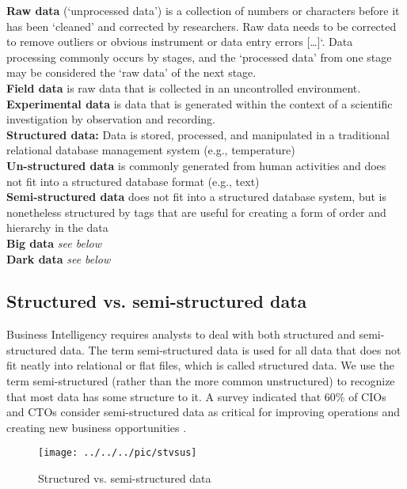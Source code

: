 \textbf{Raw data} (`unprocessed data') is a collection of numbers or characters before it has been `cleaned' and corrected by researchers. Raw data needs to be corrected to remove outliers or obvious instrument or data entry errors [\dots]`. Data processing commonly occurs by stages, and the `processed data' from one stage may be considered the `raw data' of the next stage.\\
\textbf{Field data} is raw data that is collected in an uncontrolled environment.\\
\textbf{Experimental data} is data that is generated within the context of a scientific investigation by observation and recording.\\
\textbf{Structured data:} Data is stored, processed, and manipulated in a traditional relational
database management system (e.g., temperature)\\
\textbf{Un-structured data} is commonly generated from human activities and does not
fit into a structured database format (e.g., text)\\
\textbf{Semi-structured data} does not fit into a structured database system, but is
nonetheless structured by tags that are useful for creating a form of order and
hierarchy in the data\\
\textbf{Big data} \textit{see below}\\
\textbf{Dark data} \textit{see below}


\pbn
\subsection{Structured vs. semi-structured data}
Business Intelligency requires analysts to deal with both structured and semi-structured data. The term semi-structured data is used for all data that does not fit neatly into relational or flat files, which is called structured data.
We use the term semi-structured (rather than the more common unstructured) to recognize that most data has some structure to it. A survey indicated that 60\% of CIOs and CTOs consider semi-structured data as critical for improving operations and creating new business opportunities \citep{Blumberg2003Problem}.

\begin{figure}[H]
	\begin{center}
		\texttt{[image: ../../../pic/stvsus]}
	\end{center}
	\caption{Structured vs. semi-structured data}
\end{figure}

